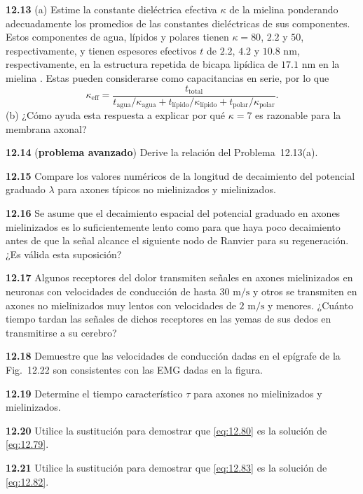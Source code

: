\documentclass[12pt]{book}
\begin{document}
\noindent \textbf{12.13} (a) Estime la constante dieléctrica efectiva $\kappa$ de la mielina ponderando adecuadamente los promedios de las constantes dieléctricas de sus componentes. Estos componentes de agua, lípidos y polares tienen $\kappa = 80$, $2.2$ y $50$, respectivamente, y tienen espesores efectivos $t$ de $2.2$, $4.2$ y $10.8\text{ nm}$, respectivamente, en la estructura repetida de bicapa lipídica de $17.1\text{ nm}$ en la mielina \cite{17}. Estas pueden considerarse como capacitancias en serie, por lo que
\begin{equation}
\kappa_{\text{eff}} = \frac{t_{\text{total}}}{t_{\text{agua}}/\kappa_{\text{agua}} + t_{\text{lípido}}/\kappa_{\text{lípido}} + t_{\text{polar}}/\kappa_{\text{polar}}}.
\label{eq:12.95}
\end{equation}
(b) ¿Cómo ayuda esta respuesta a explicar por qué $\kappa = 7$ es razonable para la membrana axonal?

\noindent \textbf{12.14} (\textbf{problema avanzado}) Derive la relación del Problema~12.13(a).

\noindent \textbf{12.15} Compare los valores numéricos de la longitud de decaimiento del potencial graduado $\lambda$ para axones típicos no mielinizados y mielinizados.

\noindent \textbf{12.16} Se asume que el decaimiento espacial del potencial graduado en axones mielinizados es lo suficientemente lento como para que haya poco decaimiento antes de que la señal alcance el siguiente nodo de Ranvier para su regeneración. ¿Es válida esta suposición?

\noindent \textbf{12.17} Algunos receptores del dolor transmiten señales en axones mielinizados en neuronas con velocidades de conducción de hasta $30\text{ m/s}$ y otros se transmiten en axones no mielinizados muy lentos con velocidades de $2\text{ m/s}$ y menores. ¿Cuánto tiempo tardan las señales de dichos receptores en las yemas de sus dedos en transmitirse a su cerebro?

\noindent \textbf{12.18} Demuestre que las velocidades de conducción dadas en el epígrafe de la Fig.~12.22 son consistentes con las EMG dadas en la figura.

\noindent \textbf{12.19} Determine el tiempo característico $\tau$ para axones no mielinizados y mielinizados.

\noindent \textbf{12.20} Utilice la sustitución para demostrar que \eqref{eq:12.80} es la solución de \eqref{eq:12.79}.

\noindent \textbf{12.21} Utilice la sustitución para demostrar que \eqref{eq:12.83} es la solución de \eqref{eq:12.82}.
\end{document}
